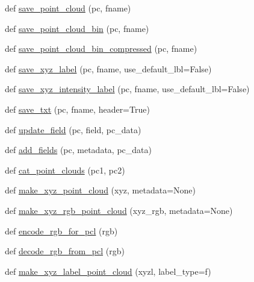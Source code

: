 \begin{DoxyCompactItemize}
\item 
def \hyperlink{namespacepypcd__hack_1_1pypcd_a8535ec59422d4edc82f22f6ce269b22b}{save\+\_\+point\+\_\+cloud} (pc, fname)
\item 
def \hyperlink{namespacepypcd__hack_1_1pypcd_a8d901a6917508e63e158fbae069d1628}{save\+\_\+point\+\_\+cloud\+\_\+bin} (pc, fname)
\item 
def \hyperlink{namespacepypcd__hack_1_1pypcd_abd2032038eac8692ef731459ebbdca97}{save\+\_\+point\+\_\+cloud\+\_\+bin\+\_\+compressed} (pc, fname)
\item 
def \hyperlink{namespacepypcd__hack_1_1pypcd_a83a5e64283fc67becc4380ae964a269d}{save\+\_\+xyz\+\_\+label} (pc, fname, use\+\_\+default\+\_\+lbl=False)
\item 
def \hyperlink{namespacepypcd__hack_1_1pypcd_a7bd8687c8696e464c057ac6e94fed02c}{save\+\_\+xyz\+\_\+intensity\+\_\+label} (pc, fname, use\+\_\+default\+\_\+lbl=False)
\item 
def \hyperlink{namespacepypcd__hack_1_1pypcd_aeac370634949adb389fb6221ce09a663}{save\+\_\+txt} (pc, fname, header=True)
\item 
def \hyperlink{namespacepypcd__hack_1_1pypcd_a4b83dab7c0e2a8c67bbddd45e2fe2ff2}{update\+\_\+field} (pc, field, pc\+\_\+data)
\item 
def \hyperlink{namespacepypcd__hack_1_1pypcd_a82ac240d16f3519a9a4984a0e0b44c9a}{add\+\_\+fields} (pc, metadata, pc\+\_\+data)
\item 
def \hyperlink{namespacepypcd__hack_1_1pypcd_a8fb9fd1977dac6b877b2d3f8f43388f9}{cat\+\_\+point\+\_\+clouds} (pc1, pc2)
\item 
def \hyperlink{namespacepypcd__hack_1_1pypcd_a577a54423f71a8d86e80d7b15ded09aa}{make\+\_\+xyz\+\_\+point\+\_\+cloud} (xyz, metadata=None)
\item 
def \hyperlink{namespacepypcd__hack_1_1pypcd_a03097a8bbe76827f519fe2f960f37e19}{make\+\_\+xyz\+\_\+rgb\+\_\+point\+\_\+cloud} (xyz\+\_\+rgb, metadata=None)
\item 
def \hyperlink{namespacepypcd__hack_1_1pypcd_aeb5d9633c49c1c7c6d456301fbb75a43}{encode\+\_\+rgb\+\_\+for\+\_\+pcl} (rgb)
\item 
def \hyperlink{namespacepypcd__hack_1_1pypcd_a71f4e506eeb77e5514c7d1ce1d8130b8}{decode\+\_\+rgb\+\_\+from\+\_\+pcl} (rgb)
\item 
def \hyperlink{namespacepypcd__hack_1_1pypcd_ac1b992c24065b93d4330e8b22478579e}{make\+\_\+xyz\+\_\+label\+\_\+point\+\_\+cloud} (xyzl, label\+\_\+type=\textquotesingle{}f\textquotesingle{})
\end{DoxyCompactItemize}
